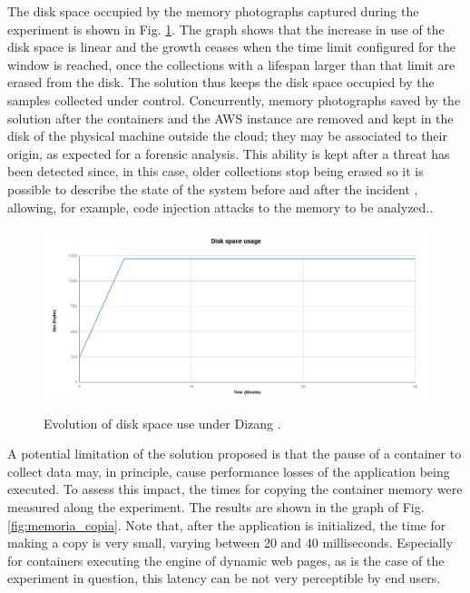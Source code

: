 \documentclass[conference]{IEEEtran}
\newcommand{\fancyname}{Dizang }
\begin{document}
The disk space occupied by the memory photographs captured during the experiment is shown in Fig. \ref{fig:evolucao_coleta}. 
%
The graph shows that the increase in use of the disk space is linear and the growth ceases when the time limit configured for the window is reached, once the collections with a lifespan larger than that limit are erased from the disk. 
%
The solution thus keeps the disk space occupied by the samples collected under control.
%
Concurrently, memory photographs saved by the solution after the containers and the AWS instance are removed and kept in the disk of the physical machine outside the cloud; they may be associated to their origin, as expected for a forensic analysis. 
%
This ability is kept after a threat has been detected since, in this case, older collections stop being erased so it is possible to describe the state of the system before and after the incident \cite{Case_Memory_Forensics:2014}, allowing, for example, code injection attacks to the memory to be analyzed..


\begin{figure}[htb!]
\footnotesize
\caption{Evolution of disk space use under \fancyname.}
\includegraphics[scale=0.42]{evolucao_coleta_ieee.png}
\centering
\label{fig:evolucao_coleta}
\end{figure}


A potential limitation of the solution proposed is that the pause of a container to collect data may, in principle, cause performance losses of the application being executed. 
%
To assess this impact, the times for copying the container memory were measured along the experiment.
%
The results are shown in the graph of Fig. \ref{fig:memoria_copia}.
%
Note that, after the application is initialized, the time for making a copy is very small, varying between 20 and 40 milliseconds. 
%
Especially for containers executing the engine of dynamic web pages, as is the case of the experiment in question, this latency can be not very perceptible by end users.
\end{document}
